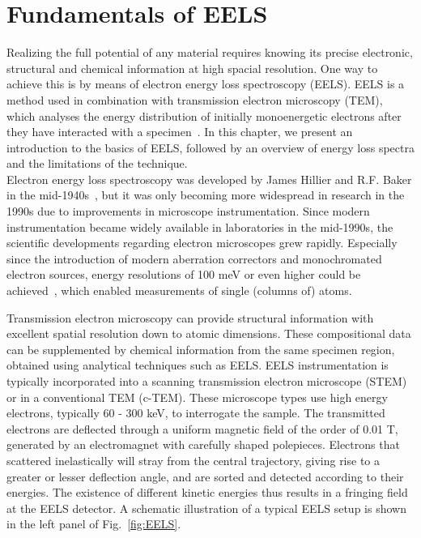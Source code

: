 \section{Fundamentals of EELS}
\label{sec:eels}

Realizing the full potential of any material requires knowing its 
precise electronic, structural and chemical information at high spacial resolution.
%
One way to achieve this is by means of electron energy loss spectroscopy (EELS).
%
EELS is a method used in combination with 
transmission electron microscopy (TEM), which analyses the 
energy distribution of initially monoenergetic electrons after
they have interacted with a specimen~\cite{Egerton:1996}. 
%
In this chapter, we present an introduction to the basics
of EELS, followed by an overview of energy loss spectra and 
the limitations of the technique.\\

Electron energy loss spectroscopy was developed by James Hillier and R.F. Baker in 
the mid-1940s~\cite{Hillier:1944},
but it was only becoming more widespread in research in the 1990s 
due to improvements in microscope instrumentation. 
%
Since modern instrumentation became widely available in laboratories in the
mid-1990s, the scientific developments regarding electron microscopes grew rapidly.
%
Especially since the introduction of modern aberration correctors
and monochromated electron sources, energy resolutions of 100 meV
or even higher could be achieved~\cite{Rose:2008},
which enabled measurements of single (columns of) atoms. 

Transmission electron microscopy can provide structural information 
with excellent spatial resolution down to atomic dimensions. 
%
These compositional data can be supplemented by chemical information 
from the same specimen region, obtained using analytical techniques
such as EELS.
%
EELS instrumentation is typically incorporated into a scanning
transmission electron microscope (STEM) or in a conventional TEM (c-TEM).
%
These microscope types use high energy electrons, typically 60 - 300 keV, 
to interrogate the sample. 
%
The transmitted electrons are deflected through a uniform magnetic field 
of the order of 0.01 T, generated by an electromagnet with carefully shaped polepieces. 
%
Electrons that scattered inelastically will stray from the central trajectory, 
giving rise to a greater or lesser deflection angle, 
and are sorted and detected according to their energies. 
%
The existence of different kinetic energies thus results in a fringing 
field at the EELS detector.
%
A schematic illustration of a typical EELS setup is shown in the left panel of Fig.~\ref{fig:EELS}.
%

